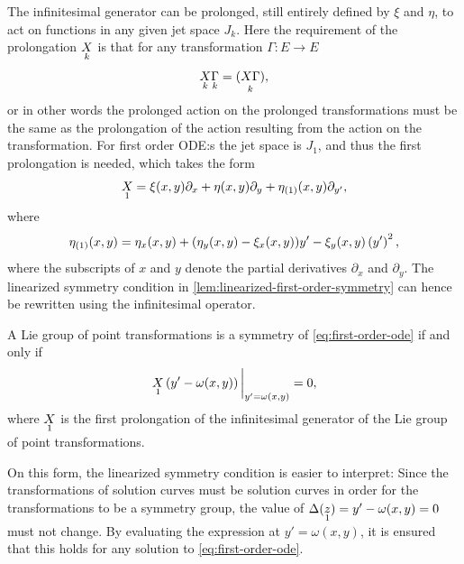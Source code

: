 The infinitesimal generator can be prolonged, still entirely defined by \(\xi\) and \(\eta\), to act on functions in any given jet space \(J_k\).
Here the requirement of the prolongation \(\prolong{X}{k}\) is that for any transformation \(\Gamma: E \to E\)
\begin{equation}
  \prolong{X}{k} \prolong{\Gamma}{k} = \prolong{\left(X \Gamma\right)}{k},
\end{equation}
or in other words the prolonged action on the prolonged transformations must be the same as the prolongation of the action resulting from the action on the transformation.
For first order ODE:s the jet space is \(J_1\), and thus the first prolongation is needed, which takes the form
\begin{equation}
  \prolong{X}{1} =
  \xi(x,y) \partial_x + \eta(x,y) \partial_y + \prolongpart{\eta}{1}(x,y) \partial_{y'},
\end{equation}
where
\begin{equation}
  \prolongpart{\eta}{1}(x,y) =
  \eta_x(x,y) + (\eta_y(x,y) - \xi_x(x,y)) y' - \xi_y(x,y) \left(y'\right)^2,
\end{equation}
where the subscripts of \(x\) and \(y\) denote the partial derivatives \(\partial_x\) and \(\partial_y\).
The linearized symmetry condition in \cref{lem:linearized-first-order-symmetry} can hence be rewritten using the infinitesimal operator.
\begin{lem} \label{lem:linearized-first-order-symmetry-infinitesimal}
  A Lie group of point transformations is a symmetry of \cref{eq:first-order-ode} if and only if
  \begin{equation} \label{eq:linearized-first-order-symmetry}
    \eval{\prolong{X}{1}\left(y' - \omega(x,y)\right)}_{y' = \omega(x,y)} = 0,
  \end{equation}
  where \(\prolong{X}{1}\) is the first prolongation of the infinitesimal generator of the Lie group of point transformations.
\end{lem}
On this form, the linearized symmetry condition is easier to interpret:
Since the transformations of solution curves must be solution curves in order for the transformations to be a symmetry group, the value of \(\Delta(\prolong{z}{1}) = y' - \omega(x,y) = 0\) must not change.
By evaluating the expression at \(y' = \omega(x,y)\), it is ensured that this holds for any solution to \cref{eq:first-order-ode}.

